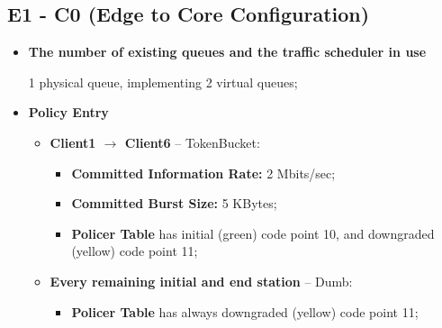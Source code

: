 \documentclass[conference,compsoc]{IEEEtran}
\begin{document}
    \subsection{E1 - C0 (Edge to Core Configuration)}
    \begin{itemize}
        \item \textbf{The number of existing queues and the traffic scheduler in use} \par 
        1 physical queue,  implementing 2 virtual queues;  
        \vspace{5mm}
        \item \textbf{Policy Entry}
        \begin{itemize}
            \item \textbf{Client1 $\rightarrow$ Client6} -- TokenBucket:
            \begin{itemize}
                \item \textbf{Committed Information Rate:} 2 Mbits/sec;
                \item \textbf{Committed Burst Size:} 5 KBytes;
                \item \textbf{Policer Table} has initial (green) code point 10, and downgraded (yellow) code point 11;
            \end{itemize}
            \item \textbf{Every remaining initial and end station} -- Dumb:
             \begin{itemize}
                \item \textbf{Policer Table} has always downgraded (yellow) code point 11;
            \end{itemize}
        \end{itemize}
        

\end{itemize}
\end{document}
